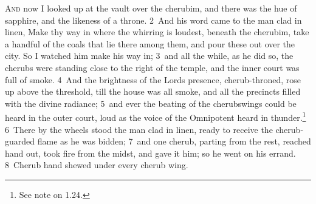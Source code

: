 \documentclass[10pt]{book} %
\begin{document}
\lettrine[lines=2]{A}{nd} now I looked up at the vault over the cherubim, and there was the hue of sapphire, and the likeness of a throne.
\textcolor{benred8}{2}~And his word came to the man clad in linen, Make thy way in where the whirring is loudest, beneath the cherubim, take a handful of the coals that lie there among them, and pour these out over the city. So I watched him make his way in; \textcolor{benred8}{3}~and all the while, as he did so, the cherubs were standing close to the right of the temple, and the inner court was full of smoke. \textcolor{benred8}{4}~And the brightness of the Lord\textquotesingle s presence, cherub-throned, rose up above the threshold, till the house was all smoke, and all the precincts filled with the divine radiance; \textcolor{benred8}{5}~and ever the beating of the cherubs\textquotesingle  wings could be heard in the outer court, loud as the voice of the Omnipotent heard in thunder.\footnote[1]{See note on 1.24.} \textcolor{benred8}{6}~There by the wheels stood the man clad in linen, ready to receive the cherub-guarded flame as he was bidden; \textcolor{benred8}{7}~and one cherub, parting from the rest, reached hand out, took fire from the midst, and gave it him; so he went on his errand. \textcolor{benred8}{8}~Cherub hand shewed under every cherub wing.
\end{document}
